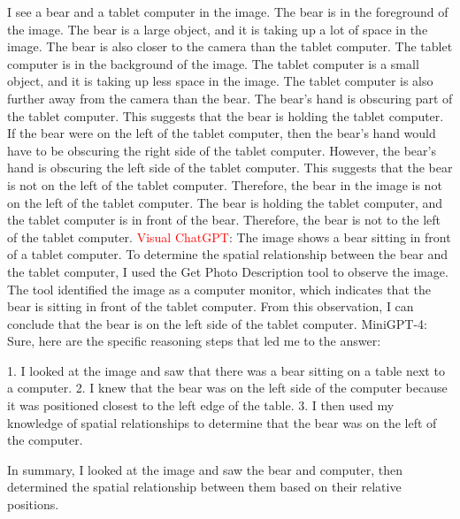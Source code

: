 \begin{enumerate}
    I see a bear and a tablet computer in the image.
    The bear is in the foreground of the image. The bear is a large object, and it is taking up a lot of space in the image. The bear is also closer to the camera than the tablet computer.
    The tablet computer is in the background of the image. The tablet computer is a small object, and it is taking up less space in the image. The tablet computer is also further away from the camera than the bear.
    The bear's hand is obscuring part of the tablet computer. This suggests that the bear is holding the tablet computer.
    If the bear were on the left of the tablet computer, then the bear's hand would have to be obscuring the right side of the tablet computer. However, the bear's hand is obscuring the left side of the tablet computer. This suggests that the bear is not on the left of the tablet computer.
    Therefore, the bear in the image is not on the left of the tablet computer. The bear is holding the tablet computer, and the tablet computer is in front of the bear. Therefore, the bear is not to the left of the tablet computer.
    \subitem \textcolor{red}{Visual ChatGPT}: The image shows a bear sitting in front of a tablet computer. To determine the spatial relationship between the bear and the tablet computer, I used the Get Photo Description tool to observe the image. The tool identified the image as a computer monitor, which indicates that the bear is sitting in front of the tablet computer. From this observation, I can conclude that the bear is on the left side of the tablet computer.
    \subitem MiniGPT-4: Sure, here are the specific reasoning steps that led me to the answer:

    1. I looked at the image and saw that there was a bear sitting on a table next to a computer.
    2. I knew that the bear was on the left side of the computer because it was positioned closest to the left edge of the table.
    3. I then used my knowledge of spatial relationships to determine that the bear was on the left of the computer.
    
    In summary, I looked at the image and saw the bear and computer, then determined the spatial relationship between them based on their relative positions.
\end{enumerate}
